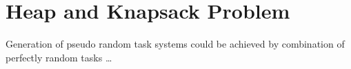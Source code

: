 \section{Heap and Knapsack Problem}

Generation of pseudo random task systems could be achieved by combination of perfectly random tasks \dots


